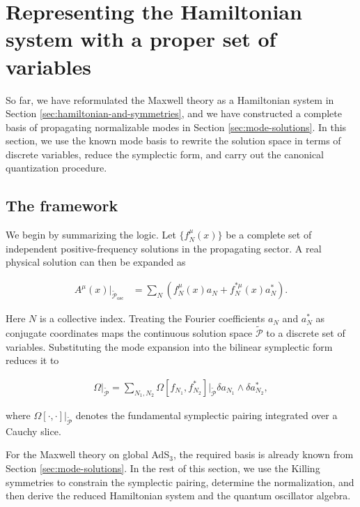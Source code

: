 \section{Representing the Hamiltonian system with a proper set of variables}\label{sec:quantization}

So far, we have reformulated the Maxwell theory as a Hamiltonian system in Section \ref{sec:hamiltonian-and-symmetries}, and we have constructed a complete basis of propagating normalizable modes in Section \ref{sec:mode-solutions}. In this section, we use the known mode basis to rewrite the solution space in terms of discrete variables, reduce the symplectic form, and carry out the canonical quantization procedure.

\subsection{The framework}\label{subsec:quantization-framework}

We begin by summarizing the logic. Let $\{f_{N}^{\mu}(x)\}$ be a complete set of independent positive-frequency solutions in the propagating sector. A real physical solution can then be expanded as

\begin{align}
A^{\mu}(x)\big|_{\widetilde{\mathcal{P}}_{\mathrm{osc}}}&=\sum_{N}\left(f_{N}^{\mu}(x)a_{N}+f_{N}^{*\mu}(x)a_{N}^{*}\right).
\end{align}

Here $N$ is a collective index. Treating the Fourier coefficients $a_N$ and $a_N^*$ as conjugate coordinates maps the continuous solution space $\widetilde{\mathcal{P}}$ to a discrete set of variables. Substituting the mode expansion into the bilinear symplectic form reduces it to

\begin{align}
\Omega\big|_{\widetilde{\mathcal{P}}} =\sum_{N_1, N_2} \Omega[f_{N_1}, f^{*}_{N_2}]\big|_{\widetilde{\mathcal{P}}} \delta a_{N_1} \wedge \delta a^{*}_{N_2},
\end{align}

where $\Omega[\cdot,\cdot]|_{\widetilde{\mathcal{P}}}$ denotes the fundamental symplectic pairing integrated over a Cauchy slice.

For the Maxwell theory on global AdS$_3$, the required basis is already known from Section \ref{sec:mode-solutions}. In the rest of this section, we use the Killing symmetries to constrain the symplectic pairing, determine the normalization, and then derive the reduced Hamiltonian system and the quantum oscillator algebra.

